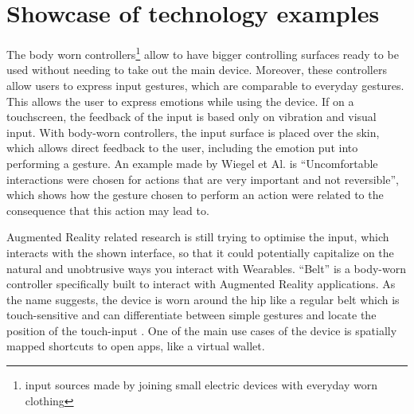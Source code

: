 \documentclass{sigchi}
\begin{document}
\section{Showcase of technology examples}
%
The body worn controllers\footnote{input sources made by joining small electric devices with everyday worn clothing} %
allow to have bigger controlling surfaces ready to be used without needing to take out the main device. Moreover, these controllers allow users to express input gestures, which are comparable to everyday gestures. This allows the user to express emotions while using the device. If on a touchscreen, the feedback of the input is based only on vibration and visual input. With body-worn controllers, the input surface is placed over the skin, which allows direct feedback to the user, including the emotion put into performing a gesture. An example made by Wiegel et Al. %
\cite[p.185]{more-touch} is “Uncomfortable interactions were chosen for actions that are very important and not reversible”, which shows how the gesture chosen to perform an action were related to the consequence that this action may lead to.


Augmented Reality related research is still trying to optimise the input, which interacts with the shown interface, so that it could potentially capitalize on the natural and unobtrusive ways you interact with Wearables.
``Belt'' \cite{belt} is a body-worn controller specifically built to interact with Augmented Reality applications. As the name suggests, the device is worn around the hip like a regular belt which is touch-sensitive and can differentiate between simple gestures and locate the position of the touch-input \cite[p. 2136]{belt}.%
One of the main use cases of the device is spatially mapped shortcuts to open apps, like a virtual wallet. \cite{belt}
\end{document}
